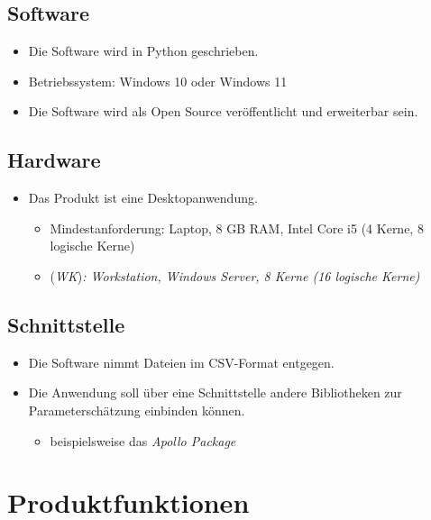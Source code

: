 \documentclass{article}
\begin{document}
\subsection{Software}
\begin{itemize}
    \item Die Software wird in Python geschrieben.
    \item Betriebssystem: Windows 10 oder Windows 11
    \item Die Software wird als Open Source veröffentlicht und erweiterbar sein.
\end{itemize}
\subsection{Hardware}
\begin{itemize}
    \item Das Produkt ist eine Desktopanwendung.
    \begin{itemize}
        \item Mindestanforderung: Laptop, 8 GB RAM, Intel Core i5 (4 Kerne, 8 logische Kerne)
        \item (\textit{WK})\textit{: Workstation, Windows Server, 8 Kerne (16 logische Kerne)}
    \end{itemize}
\end{itemize}
\subsection{Schnittstelle}
\begin{itemize}
    \item Die Software nimmt Dateien im CSV-Format entgegen.
    \item Die Anwendung soll über eine Schnittstelle andere Bibliotheken zur Parameterschätzung einbinden können.
    \begin{itemize}
        \item beispielsweise das \textit{Apollo Package}
    \end{itemize}
\end{itemize}
\newpage

\section{Produktfunktionen}
\end{document}
